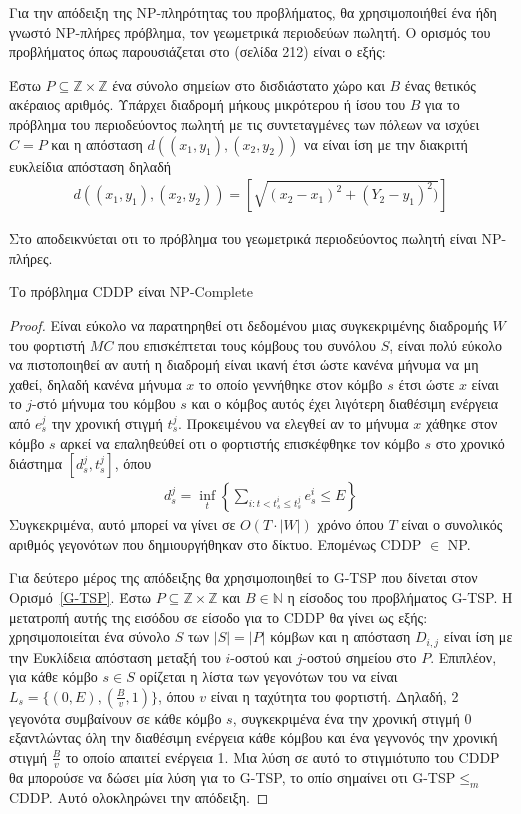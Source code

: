 Για την απόδειξη της NP-πληρότητας του προβλήματος, θα χρησιμοποιήθεί ένα ήδη γνωστό NP-πλήρες πρόβλημα, τον γεωμετρικά περιοδεύων πωλητή. Ο ορισμός του προβλήματος
όπως παρουσιάζεται στο \cite{Garey_Johnson} (σελίδα 212) είναι ο εξής:
\begin{definition}
\label{G-TSP} 
Έστω $P \subseteq \mathbb{Z} \times \mathbb{Z}$ ένα σύνολο σημείων στο δισδιάστατο χώρο και $B$ ένας θετικός ακέραιος αριθμός.
Υπάρχει διαδρομή μήκους μικρότερου ή ίσου του $B$ για το πρόβλημα του περιοδεύοντος πωλητή με τις συντεταγμένες των πόλεων να ισχύει $C=P$ και η απόσταση
$d((x_{1},y_{1}),(x_{2},y_{2}))$ να είναι ίση με την διακριτή ευκλείδια απόσταση δηλαδή
\begin{align*}
d((x_{1},y_{1}),(x_{2},y_{2})) = [\sqrt{(x_{2}-x_{1})^{2} + (Y_{2}-y_{1})^{2})}]
\end{align*}
\end{definition}
Στο \cite{PapadimitriouNP} αποδεικνύεται οτι το πρόβλημα του γεωμετρικά περιοδεύοντος πωλητή είναι NP-πλήρες.
\begin{theorem}\label{th:np-complete}
Το πρόβλημα CDDP είναι NP-Complete
\end{theorem}
\begin{proof}
Είναι εύκολο να παρατηρηθεί οτι δεδομένου μιας συγκεκριμένης διαδρομής $W$ του φορτιστή $MC$ που επισκέπτεται τους κόμβους του συνόλου $S$, είναι πολύ εύκολο να
πιστοποιηθεί αν αυτή η διαδρομή είναι ικανή έτσι ώστε κανένα μήνυμα να μη χαθεί, δηλαδή κανένα μήνυμα $x$ το οποίο γεννήθηκε στον κόμβο $s$ έτσι ώστε $x$ είναι το
$j$-στό μήνυμα του κόμβου $s$ και ο κόμβος αυτός έχει λιγότερη διαθέσιμη ενέργεια από $e^{j}_{s}$ την χρονική στιγμή $t^{j}_{s}$. Προκειμένου να ελεγθεί αν το μήνυμα
$x$ χάθηκε στον κόμβο $s$ αρκεί να επαληθεύθεί οτι ο φορτιστής επισκέφθηκε τον κόμβο $s$ στο χρονικό διάστημα $[d_s^j, t_s^j]$, όπου
\begin{align*}
d_s^j = \inf_t\left\{ \sum_{i: t < t_s^i \leq t_s^j} e_s^{i} \leq E \right\}
\end{align*}
Συγκεκριμένα, αυτό μπορεί να γίνει σε $O(T \cdot |W|)$ χρόνο όπου $T$ είναι ο συνολικός αριθμός γεγονότων που δημιουργήθηκαν στο δίκτυο. Επομένως CDDP $\in$ NP.

Για δεύτερο μέρος της απόδειξης θα χρησιμοποιηθεί το G-TSP που δίνεται στον Ορισμό~\ref{G-TSP}. Έστω $P \subseteq \mathbb{Z} \times \mathbb{Z}$ και $Β\in
\mathbb{N}$ η είσοδος του προβλήματος G-TSP. Η μετατροπή αυτής της εισόδου σε είσοδο για το CDDP θα γίνει ως εξής: χρησιμοποιείται ένα σύνολο $S$ των $|S|=|P|$
κόμβων και η απόσταση $D_{i,j}$ είναι ίση με την Ευκλίδεια απόσταση μεταξή του $i$-οστού και $j$-οστού σημείου στο $P$. Επιπλέον, για κάθε κόμβο $s\in S$
ορίζεται η λίστα των γεγονότων του να είναι $L_{s} = \{(0, E), (\frac{B}{v}, 1)\}$, όπου $v$ είναι η ταχύτητα του φορτιστή. Δηλαδή, 2 γεγονότα συμβαίνουν σε κάθε
κόμβο $s$, συγκεκριμένα ένα την χρονική στιγμή 0 εξαντλώντας όλη την διαθέσιμη ενέργεια κάθε κόμβου και ένα γεγνονός την χρονική στιγμή $\frac{B}{v}$ το οποίο
απαιτεί ενέργεια 1. Μια λύση σε αυτό το στιγμιότυπο του CDDP θα μπορούσε να δώσει μία λύση για το G-TSP, το οπίο σημαίνει οτι G-TSP$\leq_{m}$CDDP. Αυτό ολοκληρώνει
την απόδειξη.
\end{proof}
